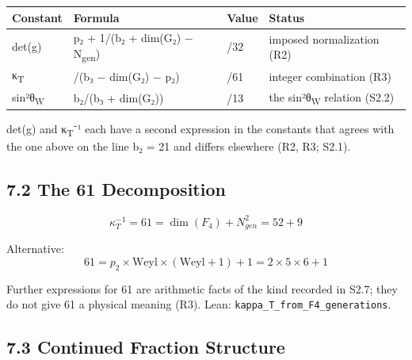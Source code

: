 \documentclass[11pt,a4paper]{article}
\begin{document}
\begin{longtable}[]{@{}
  >{\raggedright\arraybackslash}p{}
  >{\raggedright\arraybackslash}p{}
  >{\raggedright\arraybackslash}p{}
  >{\raggedright\arraybackslash}p{}@{}}
\toprule\noalign{}
\begin{minipage}[b]{\linewidth}\raggedright
Constant
\end{minipage} & \begin{minipage}[b]{\linewidth}\raggedright
Formula
\end{minipage} & \begin{minipage}[b]{\linewidth}\raggedright
Value
\end{minipage} & \begin{minipage}[b]{\linewidth}\raggedright
Status
\end{minipage} \\
\midrule\noalign{}
\endhead
\bottomrule\noalign{}
\endlastfoot
det(g) & p₂ + 1/(b₂ + dim(G₂) − N\textsubscript{gen}) & 65/32 & imposed normalization (R2) \\
κ\textsubscript{T} & 1/(b₃ − dim(G₂) − p₂) & 1/61 & integer combination (R3) \\
sin²θ\textsubscript{W} & b₂/(b₃ + dim(G₂)) & 3/13 & the sin²θ\textsubscript{W} relation (S2.2) \\
\end{longtable}

det(g) and κ\textsubscript{T}⁻¹ each have a second expression in the constants that agrees with the one above on the line b₂ = 21 and differs elsewhere (R2, R3; S2.1).

\subsection{7.2 The 61 Decomposition}\label{the-61-decomposition}

\[\kappa_T^{-1} = 61 = \dim(F_4) + N_{gen}^2 = 52 + 9\]

Alternative: \[61 = p_2 \times \text{Weyl} \times (\text{Weyl} + 1) + 1 = 2 \times 5 \times 6 + 1\]

Further expressions for 61 are arithmetic facts of the kind recorded in S2.7; they do not give 61 a physical meaning (R3). Lean: \texttt{kappa\_\allowbreak{}T\_\allowbreak{}from\_\allowbreak{}F4\_\allowbreak{}generations}.

\subsection{7.3 Continued Fraction Structure}\label{continued-fraction-structure}
\end{document}
